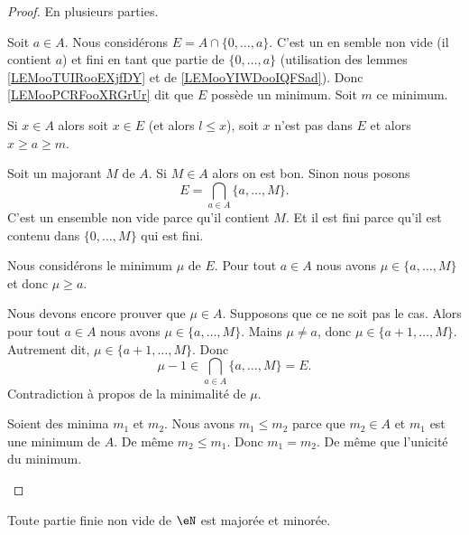 \begin{proof}
	En plusieurs parties.
	\begin{subproof}
		Soit \( a\in A\). Nous considérons \( E=A\cap\{ 0,\ldots,a \}\). C'est un en semble non vide (il contient \( a\)) et fini en tant que partie de \( \{ 0,\ldots,a \}\) (utilisation des lemmes \ref{LEMooTUIRooEXjfDY} et de \ref{LEMooYIWDooIQFSad}). Donc \ref{LEMooPCRFooXRGrUr} dit que \( E\) possède un minimum. Soit \( m\) ce minimum.

		Si \( x\in A\) alors soit \( x\in E\) (et alors \( l\leq x\)), soit \( x\) n'est pas dans \( E\) et alors \( x\geq a\geq m\).

		Soit un majorant \( M\) de \( A\). Si \( M\in A\) alors on est bon. Sinon nous posons
		\begin{equation}
			E=\bigcap_{a\in A}\{ a,\ldots,M \}.
		\end{equation}
		C'est un ensemble non vide parce qu'il contient \( M\). Et il est fini parce qu'il est contenu dans \( \{ 0,\ldots,M \}\) qui est fini.

		Nous considérons le minimum \( \mu\) de \( E\). Pour tout \( a\in A\) nous avons \( \mu\in\{ a,\ldots,M \}\) et donc \( \mu\geq a\).

		Nous devons encore prouver que \( \mu\in A\). Supposons que ce ne soit pas le cas. Alors pour tout \( a\in A\) nous avons \( \mu\in \{ a,\ldots,M \}\). Mains \( \mu\neq a\), donc \( \mu\in\{ a+1,\ldots,M \}\). Autrement dit, \( \mu\in\{ a+1,\ldots,M \}\). Donc
		\begin{equation}
			\mu-1\in \bigcap_{a\in A}\{ a,\ldots,M \}=E.
		\end{equation}
		Contradiction à propos de la minimalité de \( \mu\).

		Soient des minima \( m_1\) et \( m_2\). Nous avons \( m_1\leq m_2\) parce que \( m_2\in A\) et \( m_1\) est une minimum de \( A\). De même \( m_2\leq m_1\). Donc \( m_1=m_2\).
		De même que l'unicité du minimum.
	\end{subproof}
\end{proof}

\begin{lemma}       \label{LEMooKUWUooPLWelf}
	Toute partie finie non vide de \( \eN\) est majorée et minorée.
\end{lemma}

